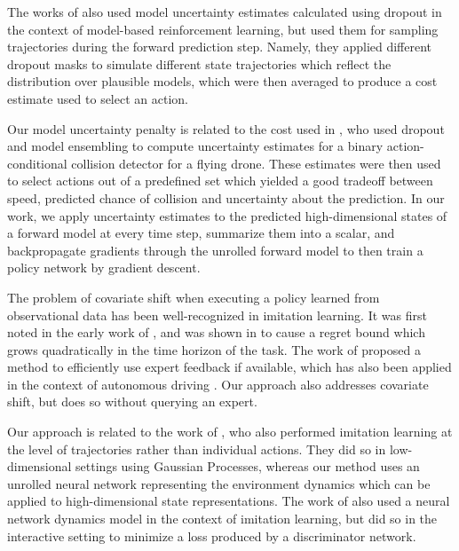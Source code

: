 \documentclass{article} %
\begin{document}
The works of \citep{DeepPilco, Chua2018} also used model uncertainty estimates calculated using dropout in the context of model-based reinforcement learning, but used them for sampling trajectories during the forward prediction step. Namely, they applied different dropout masks to simulate different state trajectories which reflect the distribution over plausible models, which were then averaged to produce a cost estimate used to select an action.

Our model uncertainty penalty is related to the cost used in \citep{Kahn2017}, who used dropout and model ensembling to compute uncertainty estimates for a binary action-conditional collision detector for a flying drone. These estimates were then used to select actions out of a predefined set which yielded a good tradeoff between speed, predicted chance of collision and uncertainty about the prediction. In our work, we apply uncertainty estimates to the predicted high-dimensional states of a forward model at every time step, summarize them into a scalar, and backpropagate gradients through the unrolled forward model to then train a policy network by gradient descent.


The problem of covariate shift when executing a policy learned from observational data has been well-recognized in imitation learning.
It was first noted in the early work of \citep{Pomerleau91}, and was shown in \citep{Ross2010EfficientRF} to cause a regret bound which grows quadratically in the time horizon of the task.
The work of \citep{Dagger} proposed a method to efficiently use expert feedback if available, which has also been applied in the context of autonomous driving \citep{Zhang16}.
Our approach also addresses covariate shift, but does so without querying an expert.

Our \modelnameil approach is related to the work of \citep{Englert2013}, who also performed imitation learning at the level of trajectories rather than individual actions. They did so in low-dimensional settings using Gaussian Processes, whereas our method uses an unrolled neural network representing the environment dynamics which can be applied to high-dimensional state representations. The work of \citep{Baram2017EndtoEndDA} also used a neural network dynamics model in the context of imitation learning, but did so in the interactive setting to minimize a loss produced by a discriminator network.
\end{document}
